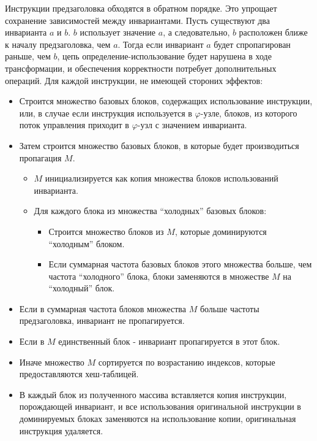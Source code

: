 Инструкции предзаголовка обходятся в обратном порядке.
Это упрощает сохранение зависимостей между инвариантами.
Пусть существуют два инварианта $a$ и $b$.
$b$ использует значение $a$, а следовательно, $b$ расположен ближе к началу предзаголовка, чем $a$.
Тогда если инвариант $a$ будет спропагирован раньше, чем $b$, цепь определение-использование будет нарушена в ходе трансформации, и обеспечения корректности потребует дополнительных операций.
Для каждой инструкции, не имеющей стороних эффектов:
\begin{itemize}
    \item Строится множество базовых блоков, содержащих использование инструкции, или, в случае если инструкция используется в $\varphi$-узле, блоков, из которого поток управления приходит в $\varphi$-узл с значением инварианта.
    \item Затем строится множество базовых блоков, в которые будет производиться пропагация $M$.
        \begin{itemize}
            \item $M$ инициализируется как копия множества блоков использований инварианта.
            \item Для каждого блока из множества \enquote{холодных} базовых блоков:
                \begin{itemize}
                    \item Строится множество блоков из $M$, которые доминируются \enquote{холодным} блоком.
                    \item Если суммарная частота базовых блоков этого множества больше, чем частота \enquote{холодного} блока, блоки заменяются в множестве $M$ на \enquote{холодный} блок.
                \end{itemize}
        \end{itemize}
    \item Если в суммарная частота блоков множества $M$ больше частоты предзаголовка, инвариант не пропагируется.
    \item Если в $M$ единственный блок - инвариант пропагируется в этот блок.
    \item Иначе множество $M$ сортируется по возрастанию индексов, которые предоставляются хеш-таблицей.
    \item В каждый блок из полученного массива вставляется копия инструкции, порождающей инвариант, и все использования оригинальной инструкции в доминируемых блоках заменяются на использование копии, оригинальная инструкция удаляется.
\end{itemize}


